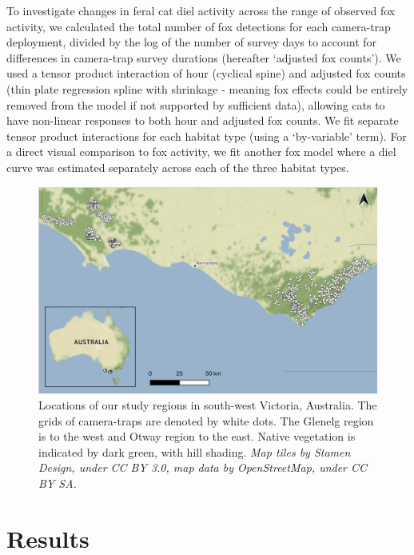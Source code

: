 \documentclass[11pt,a4paper,titlepage,twoside,openright]{style/unimelbthesis}
\begin{document}
\begin{mainmatter}
To investigate changes in feral cat diel activity across the range of observed fox activity, we calculated the total number of fox detections for each camera-trap deployment, divided by the log of the number of survey days to account for differences in camera-trap survey durations (hereafter `adjusted fox counts'). We used a tensor product interaction of hour (cyclical spine) and adjusted fox counts (thin plate regression spline with shrinkage - meaning fox effects could be entirely removed from the model if not supported by sufficient data), allowing cats to have non-linear responses to both hour and adjusted fox counts. We fit separate tensor product interactions for each habitat type (using a `by-variable' term). For a direct visual comparison to fox activity, we fit another fox model where a diel curve was estimated separately across each of the three habitat types.

\newpage
\begin{figure}

{\centering \includegraphics[width=1\linewidth]{figure/map_cams} 

}

\caption{Locations of our study regions in south-west Victoria, Australia. The grids of camera-traps are denoted by white dots. The Glenelg region is to the west and Otway region to the east. Native vegetation is indicated by dark green, with hill shading. \textit{Map tiles by Stamen Design, under CC BY 3.0, map data by OpenStreetMap, under CC BY SA.}}\label{fig:diel-map}
\end{figure}
\newpage

\hypertarget{results-3}{%
\section{Results}\label{results-3}}


\end{mainmatter}
\end{document}
